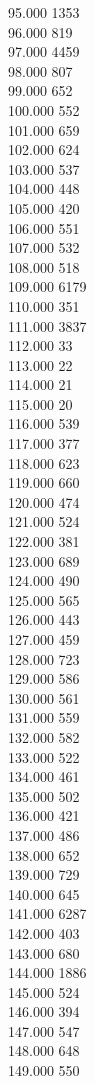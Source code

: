 { 95.000	1353 \\
 96.000	819 \\
 97.000	4459 \\
 98.000	807 \\
 99.000	652 \\
 100.000	552 \\
 101.000	659 \\
 102.000	624 \\
 103.000	537 \\
 104.000	448 \\
 105.000	420 \\
 106.000	551 \\
 107.000	532 \\
 108.000	518 \\
 109.000	6179 \\
 110.000	351 \\
 111.000	3837 \\
 112.000	33 \\
 113.000	22 \\
 114.000	21 \\
 115.000	20 \\
 116.000	539 \\
 117.000	377 \\
 118.000	623 \\
 119.000	660 \\
 120.000	474 \\
 121.000	524 \\
 122.000	381 \\
 123.000	689 \\
 124.000	490 \\
 125.000	565 \\
 126.000	443 \\
 127.000	459 \\
 128.000	723 \\
 129.000	586 \\
 130.000	561 \\
 131.000	559 \\
 132.000	582 \\
 133.000	522 \\
 134.000	461 \\
 135.000	502 \\
 136.000	421 \\
 137.000	486 \\
 138.000	652 \\
 139.000	729 \\
 140.000	645 \\
 141.000	6287 \\
 142.000	403 \\
 143.000	680 \\
 144.000	1886 \\
 145.000	524 \\
 146.000	394 \\
 147.000	547 \\
 148.000	648 \\
 149.000	550 \\
}
